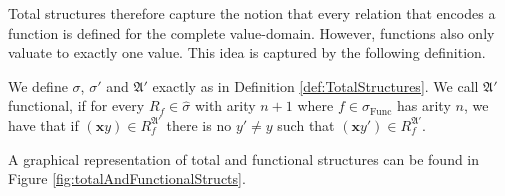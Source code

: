 Total structures therefore capture the notion that every relation that encodes a function is defined for the complete value-domain.
However, functions also only valuate to exactly one value.
This idea is captured by the following definition.

\begin{definition}
	We define $\sigma$, $\sigma'$ and $\mathfrak A'$ exactly as in Definition \ref{def:TotalStructures}.
	We call $\mathfrak A'$ functional, if for every $R_{f}\in\widehat{\sigma}$ with arity $n+1$ where $f\in \sigma_{\operatorname{Func}}$ has arity $n$, we have that if $(\mathbf xy)\in R^{\mathfrak A'}_{f}$ there is no $y'\neq y$ such that $(\mathbf xy')\in R^{\mathfrak A'}_{f}$.
\end{definition}
\iffalse
A graphical representation of total and functional structures can be found in Figure \ref{fig:totalAndFunctionalStructs}.
